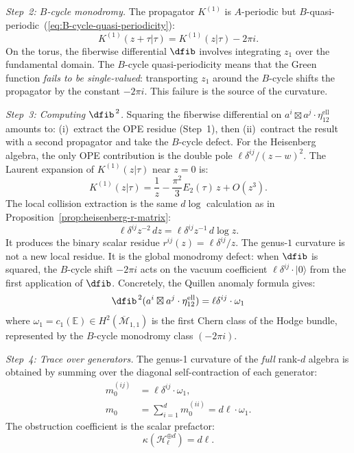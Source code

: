 \begin{computation}
\emph{Step~2: $B$-cycle monodromy.}
The propagator $K^{(1)}$ is $A$-periodic but
$B$-quasi-periodic~(\ref{eq:B-cycle-quasi-periodicity}):
\begin{equation}\label{eq:heisenberg-B-cycle-recall}
K^{(1)}(z+\tau|\tau) = K^{(1)}(z|\tau) - 2\pi i.
\end{equation}
On the torus, the fiberwise differential $\dfib$ involves
integrating $z_1$ over the fundamental domain.
The $B$-cycle quasi-periodicity means that the Green
function \emph{fails to be single-valued}: transporting
$z_1$ around the $B$-cycle shifts the propagator by the
constant $-2\pi i$. This failure is the source of the
curvature.

\emph{Step~3: Computing $\dfib^{\,2}$.}
Squaring the fiberwise differential on
$a^i \boxtimes a^j \cdot \eta_{12}^{\mathrm{ell}}$
amounts to: (i)~extract the OPE
residue (Step~1), then (ii)~contract the result with
a second propagator and take the $B$-cycle defect.
For the Heisenberg algebra, the only OPE contribution
is the double pole $\ell\delta^{ij}/(z-w)^2$.
The Laurent expansion of $K^{(1)}(z|\tau)$ near $z = 0$
is:
\[
K^{(1)}(z|\tau) = \frac{1}{z}
- \frac{\pi^2}{3}E_2(\tau)\,z + O(z^3).
\]
The local collision extraction is the same $d\log$ calculation as
in Proposition~\ref{prop:heisenberg-r-matrix}:
\[
\ell\delta^{ij}z^{-2}\,dz
=\ell\delta^{ij}z^{-1}\,d\log z .
\]
It produces the binary scalar residue
$r^{ij}(z)=\ell\delta^{ij}/z$. The genus-$1$ curvature is not a
new local residue. It is the global monodromy defect:
when $\dfib$ is squared, the $B$-cycle shift
$-2\pi i$ acts on the vacuum coefficient
$\ell\delta^{ij}\cdot|0\rangle$ from the first
application of $\dfib$.
Concretely, the Quillen anomaly formula gives:
\begin{equation}\label{eq:heisenberg-dfib-squared}
\dfib^{\,2}(a^i \boxtimes a^j
\cdot \eta_{12}^{\mathrm{ell}})
= \ell\delta^{ij}\cdot\omega_1
\end{equation}
where $\omega_1 = c_1(\mathbb{E})
\in H^2(\overline{\mathcal{M}}_{1,1})$
is the first Chern class of the Hodge bundle,
represented by the $B$-cycle monodromy class $(-2\pi i)$.

\emph{Step~4: Trace over generators.}
The genus-1 curvature of the \emph{full} rank-$d$
algebra is obtained by summing over the diagonal
self-contraction of each generator:
\begin{align}
m_0^{(ij)} &= \ell\delta^{ij}\cdot\omega_1,
\label{eq:rank-d-curvature}
\\
m_0 &= \sum_{i=1}^d m_0^{(ii)}
= d\ell\cdot\omega_1.
\end{align}
The obstruction coefficient is the scalar
prefactor:
\begin{equation}\label{eq:heisenberg-kappa-formula}
\boxed{\;\kappa(\mathcal{H}_\ell^{\oplus d})
= d\ell.\;}
\end{equation}


\end{computation}
